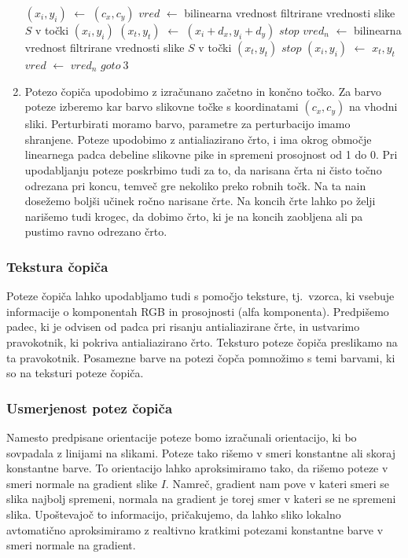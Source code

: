 \begin{enumerate}
\begin{algorithm}
  \label{alg:clipping}
\begin{algorithmic}[1]
  \State $(x_i, y_i)$ $\leftarrow$ $(c_x, c_y)$
  \State $vred$ $\leftarrow$ bilinearna vrednost filtrirane vrednosti slike $S$ v točki $(x_i, y_i)$
  \State $(x_t, y_t)$ $\leftarrow$ $(x_i + d_x, y_i + d_y)$
    \State $stop$
  \EndIf
  \State $vred_n$ $\leftarrow$ bilinearna vrednost filtrirane vrednosti slike $S$ v točki $(x_t, y_t)$
    \State $stop$
  \EndIf
  \State $(x_i, y_i)$ $\leftarrow$ $x_t, y_t$
  \State $vred$ $\leftarrow$ $vred_n$
  \State $goto\ 3$ 
\end{algorithmic}
\end{algorithm}
%
  \item Potezo čopiča upodobimo z izračunano začetno in končno točko. Za barvo poteze izberemo kar barvo slikovne točke s koordinatami $(c_x, c_y)$ na vhodni sliki. Perturbirati moramo barvo, parametre za perturbacijo imamo shranjene. Poteze upodobimo z antialiazirano črto, i ima okrog območje linearnega padca debeline slikovne pike in spremeni prosojnost od 1 do 0. Pri upodabljanju poteze poskrbimo tudi za to, da narisana črta ni čisto točno odrezana pri koncu, temveč gre nekoliko preko robnih točk. Na ta nain dosežemo boljši učinek ročno narisane črte. Na koncih črte lahko po želji narišemo tudi krogec, da dobimo črto, ki je na koncih zaobljena ali pa pustimo ravno odrezano črto.
\end{enumerate}
%
\subsubsection{Tekstura čopiča}
Poteze čopiča lahko upodabljamo tudi s pomočjo teksture, tj.\ vzorca, ki vsebuje informacije o komponentah RGB in prosojnosti (alfa komponenta). Predpišemo padec, ki je odvisen od padca pri risanju antialiazirane črte, in ustvarimo pravokotnik, ki pokriva antialiazirano črto. Teksturo poteze čopiča preslikamo na ta pravokotnik. Posamezne barve na potezi čopča pomnožimo s temi barvami, ki so na teksturi poteze čopiča.
\subsubsection{Usmerjenost potez čopiča}
Namesto predpisane orientacije poteze bomo izračunali orientacijo, ki bo sovpadala z linijami na slikami. Poteze tako rišemo v smeri konstantne ali skoraj konstantne barve. To orientacijo lahko aproksimiramo tako, da rišemo poteze v smeri normale na gradient slike $I$. Namreč, gradient nam pove v kateri smeri se slika najbolj spremeni, normala na gradient je torej smer v kateri se ne spremeni slika. Upoštevajoč to informacijo, pričakujemo, da lahko sliko lokalno avtomatično aproksimiramo z realtivno kratkimi potezami konstantne barve v smeri normale na gradient.

